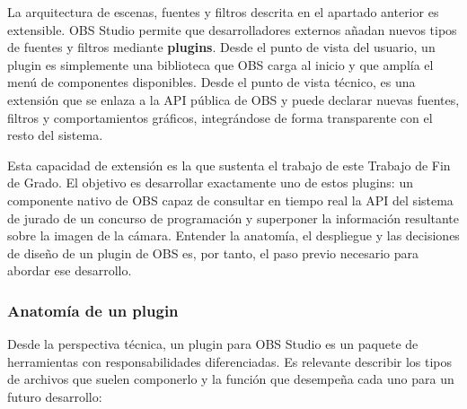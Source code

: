 La arquitectura de escenas, fuentes y filtros descrita en el apartado anterior es extensible. OBS Studio permite que desarrolladores externos añadan nuevos tipos de fuentes y filtros mediante \textbf{plugins}. Desde el punto de vista del usuario, un plugin es simplemente una biblioteca que OBS carga al inicio y que amplía el menú de componentes disponibles. Desde el punto de vista técnico, es una extensión que se enlaza a la API pública de OBS y puede declarar nuevas fuentes, filtros y comportamientos gráficos, integrándose de forma transparente con el resto del sistema.

Esta capacidad de extensión es la que sustenta el trabajo de este Trabajo de Fin de Grado. El objetivo es desarrollar exactamente uno de estos plugins: un componente nativo de OBS capaz de consultar en tiempo real la API del sistema de jurado de un concurso de programación y superponer la información resultante sobre la imagen de la cámara. Entender la anatomía, el despliegue y las decisiones de diseño de un plugin de OBS es, por tanto, el paso previo necesario para abordar ese desarrollo.
 
\subsubsection*{Anatomía de un plugin}

Desde la perspectiva técnica, un plugin para OBS Studio es un paquete de herramientas con responsabilidades  diferenciadas. Es relevante  describir los tipos de archivos que suelen componerlo y la función que desempeña cada uno para un futuro desarrollo:

